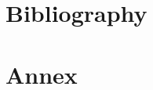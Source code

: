 \documentclass{beamer}
\begin{document}
\section*{Bibliography}
\begin{frame}
\sectionpage
\end{frame}


\begin{frame}[allowframebreaks] 
    
     
    \end{frame}

    \section*{Annex}
\begin{frame}
\sectionpage
\end{frame}
\end{document}

